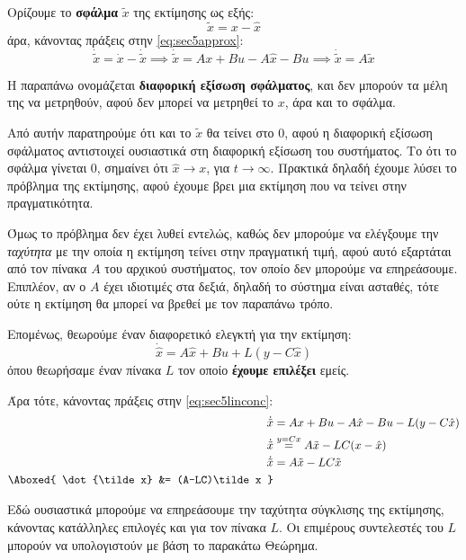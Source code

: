 \documentclass[11pt,a4paper,notitlepage,fleqn]{article}
\let\mytodo\todo
\renewcommand{\todo}[1]{\par\mytodo[inline,noline]{#1}}
\begin{document}
Ορίζουμε το \textbf{σφάλμα} \( \tilde x \) της εκτίμησης ως εξής:
\[
\tilde x = x-\hat x
\]
άρα, κάνοντας πράξεις στην \eqref{eq:sec5approx}:
\[
\dot{\tilde{x}} = \dot x - \dot{\tilde{x}}
\implies \dot{\tilde{x}} = Ax + Bu - A\hat x -Bu
\implies \boxed{\dot{\tilde{x}} = A\tilde x}
\]

Η παραπάνω ονομάζεται \textbf{διαφορική εξίσωση σφάλματος}, και δεν μπορούν
τα μέλη της να μετρηθούν, αφού δεν μπορεί να μετρηθεί το \( x \), άρα
και το σφάλμα.

Από αυτήν παρατηρούμε ότι και το \( \tilde x \) θα τείνει στο 0, αφού
η διαφορική εξίσωση σφάλματος αντιστοιχεί ουσιαστικά στη διαφορική εξίσωση
του συστήματος. Το ότι το σφάλμα γίνεται 0, σημαίνει ότι \( \hat x \to x \), για \( t \to \infty \). Πρακτικά δηλαδή έχουμε λύσει το πρόβλημα της
εκτίμησης, αφού έχουμε βρει μια εκτίμηση που να τείνει στην πραγματικότητα.

Όμως το πρόβλημα δεν έχει λυθεί εντελώς, καθώς δεν μπορούμε να ελέγξουμε την \textit{ταχύτητα} με την οποία η εκτίμηση τείνει στην πραγματική τιμή, αφού αυτό εξαρτάται από τον πίνακα \( A \) του αρχικού συστήματος, τον οποίο δεν μπορούμε να επηρεάσουμε. Επιπλέον, αν ο \( A \) έχει ιδιοτιμές
στα δεξιά, δηλαδή το σύστημα είναι ασταθές, τότε ούτε η εκτίμηση θα
μπορεί να βρεθεί με τον παραπάνω τρόπο.

Επομένως, θεωρούμε έναν διαφορετικό ελεγκτή για την εκτίμηση:
\[
\boxed{\dot{\hat x} = A\hat x + Bu + L(y-C\hat x)}
\]
όπου θεωρήσαμε έναν πίνακα \( L \) τον οποίο \textbf{έχουμε επιλέξει} εμείς.

Άρα τότε, κάνοντας πράξεις στην \eqref{eq:sec5linconc}:
\begin{align*}
	\dot{\tilde x} &= Ax + Bu - A\hat x - Bu - L(y-C\hat x)\\
	\dot{\tilde x} &\overset{y=Cx}{=} A\tilde x - LC(x-\hat x)\\
	\dot{\tilde x}&= A\tilde{x} - LC\tilde x\\
	\Aboxed{
		\dot{\tilde x} &= (A-LC)\tilde x
		}
\end{align*}
\todo{prettify}

Εδώ ουσιαστικά μπορούμε να επηρεάσουμε την ταχύτητα σύγκλισης της εκτίμησης,
κάνοντας κατάλληλες επιλογές και για τον πίνακα \( L \). Οι επιμέρους
συντελεστές του \( L \) μπορούν να υπολογιστούν με βάση το παρακάτω Θεώρημα.
\end{document}
